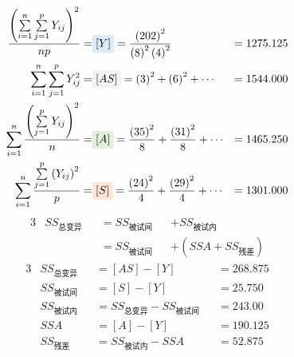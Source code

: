     \begin{align*}
            \frac{
                \left(
        	\sum\limits_{i=1}^{n} \sum\limits_{j=1}^{p}Y_{ij}
                \right)^2}
            {np}=& \colorbox[rgb]{ .867,  .922,  .969}{$[Y]$} = 
            \frac{
                \left(
        	    202
                \right)^2}
                {
                    \left(
        	           8
                    \right)^2
                    \left(
                        4
                    \right)^2
                }&=1275.125\\
            \sum\limits_{i=1}^{n} \sum\limits_{j=1}^{p}Y_{ij}^2=
            & \colorbox[rgb]{ .949,  .949,  .949}{$[AS]$} = 
            \left(
            	3
            \right)^2 +
            \left(
            	6
            \right)^2    +\cdots &=1544.000\\
            \sum\limits_{i=1}^{n}
            \frac
                {\left(
	            \sum\limits_{j=1}^{p}Y_{ij}
                \right)^2}
                {n}=
            &\colorbox[rgb]{ .886,  .937,  .855}{$[A]$}=
            \frac{\left(35\right)^2}{8}+\frac{\left(31\right)^2}{8}+\cdots&=1465.250\\
            \sum\limits_{i=1}^{n}
            \frac
            {
                \sum\limits_{j=1}^{p}\left(Y_{ij} \right)^2
            }
            {
                p            
            }            
            =&\colorbox[rgb]{ .988,  .894,  .839}{$[S]$}
            =\frac{\left( 24 \right)^2}{4} + \frac{\left( 29 \right)^2}{4} + \cdots &= 1301.000
    \end{align*}
\begin{alignat*}{3}
    & SS_{\text{总变异}}      &&  = SS_{\text{被试间}}  && + SS_{\text{被试内}}\\ 
    &                         && = SS_{\text{被试间}}  && + (SSA + SS_{\text{残差}})
\end{alignat*}
\begin{alignat*}{3}
    &    SS_{\text{总变异}}    & & =[AS]-[Y]                               && =268.875\\
    &    SS_{\text{被试间}}     & & =[S]-[Y]                                &&   =25.750\\
    &    SS_{\text{被试内}}     & & =SS_{\text{总变异}}-SS_{\text{被试间}}  &&   =243.00\\
    &    SSA                  & & =[A]-[Y]                                && =190.125\\
    &    SS_{\text{残差}}     & & =SS_{\text{被试内}}-SSA              &&  =52.875
\end{alignat*}

